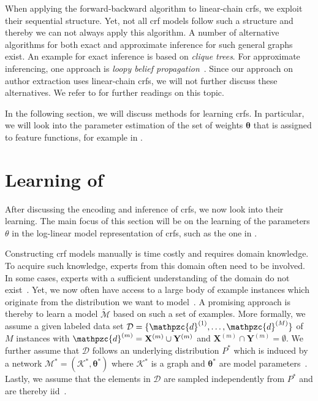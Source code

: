 \bigskip


When applying the \gls{forward-backward algorithm} to \glspl{linear-chain crf}, we exploit their sequential structure.
Yet, not all \gls{crf} models follow such a structure and thereby we can not always apply this algorithm.
A number of alternative algorithms for both exact and approximate inference for such general graphs exist.
An example for exact inference is based on \textit{clique trees}.
For approximate inferencing, one approach is \textit{loopy belief propagation}~\citep{koller2009probabilistic}.
Since our approach on author extraction uses \glspl{linear-chain crf}, we will not further discuss these alternatives.
We refer to \citet{koller2009probabilistic} for further readings on this topic.

\bigskip

In the following section, we will discuss methods for learning \glspl{crf}.
In particular, we will look into the parameter estimation of the set of weights $\bm{\theta}$ that is assigned to \glspl{feature function}, for example in .

\section{Learning of }\label{sec:learning-crfs}

After discussing the encoding and inference of \glspl{crf}, we now look into their learning.
The main focus of this section will be on the learning of the parameters $\theta$ in the \gls{log-linear model} representation of \glspl{crf}, such as the one in .

\bigskip

Constructing \gls{crf} models manually is time costly and requires domain knowledge.
To acquire such knowledge, experts from this domain often need to be involved.
In some cases, experts with a sufficient understanding of the domain do not exist~\citep{koller2009probabilistic}.
Yet, we now often have access to a large body of example instances which originate from the distribution we want to model~\citep{koller2009probabilistic}.
A promising approach is thereby to learn a model $\mathcal{\tilde{M}}$ based on such a set of examples.
More formally, we assume a given labeled data set $\mathcal{D}=\{\mathpzc{d}^{(1)},\dots,\mathpzc{d}^{(M)}\}$ of $M$ instances with $\mathpzc{d}^{(m)}=\mathbf{X}^{(m)}\cup\mathbf{Y}^{(m)}$ and $\mathbf{X}^{(m)}\cap\mathbf{Y}^{(m)}=\emptyset$.
We further assume that $\mathcal{D}$ follows an underlying distribution $P^*$ which is induced by a network $\mathcal{M}^*=(\mathcal{K}^*,\bm{\theta}^*)$ where $\mathcal{K}^*$ is a graph and $\bm{\theta}^*$ are model parameters~\citep{koller2009probabilistic}.
Lastly, we assume that the elements in $\mathcal{D}$ are sampled independently from $P^*$ and are thereby \acrfull{iid}~\citep{koller2009probabilistic}.

